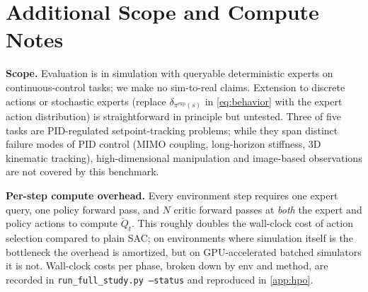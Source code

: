\documentclass{article}
\begin{document}
\section{Additional Scope and Compute Notes}
\label{app:limitations_extra}

\textbf{Scope.} Evaluation is in simulation with queryable
deterministic experts on continuous-control tasks; we make no
sim-to-real claims. Extension to discrete actions or stochastic
experts (replace $\delta_{\pi^{\mathrm{exp}}(s)}$ in \eqref{eq:behavior} with the
expert action distribution) is straightforward in principle but
untested. Three of five tasks are PID-regulated setpoint-tracking
problems; while they span distinct failure modes of PID control (MIMO
coupling, long-horizon stiffness, 3D kinematic tracking),
high-dimensional manipulation and image-based observations are not
covered by this benchmark.

\textbf{Per-step compute overhead.} Every environment step requires
one expert query, one policy forward pass, and $N$ critic forward
passes at \emph{both} the expert and policy actions to compute
$\check{Q}_t$. This roughly doubles the wall-clock cost of action
selection compared to plain SAC; on environments where simulation
itself is the bottleneck the overhead is amortized, but on
GPU-accelerated batched simulators it is not. Wall-clock costs per
phase, broken down by env and method, are recorded in
\texttt{run\_full\_study.py --status} and reproduced in
\cref{app:hpo}.
\end{document}

